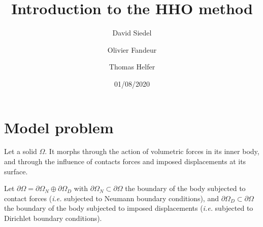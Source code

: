 \documentclass[fleqn]{article}
\title{Introduction to the HHO method}
\author{David Siedel \and Olivier Fandeur \and  Thomas Helfer}
\date{01/08/2020}
\begin{document}
  \maketitle



    
  \section{Model problem}

        Let a solid $\Omega$. It morphs through the action of volumetric forces in its inner body, and through the influence of contacts forces and imposed displacements at its surface.
        \par

        Let $\partial \Omega = \partial \Omega_N \oplus \partial \Omega_D$ with $\partial \Omega_N \subset \partial \Omega$ the boundary of the body subjected to contact forces (\textit{i.e.} subjected to Neumann boundary conditions), and $\partial \Omega_D \subset \partial \Omega$ the boundary of the body subjected to imposed displacements (\textit{i.e.} subjected to Dirichlet boundary conditions).
        \par
\end{document}
